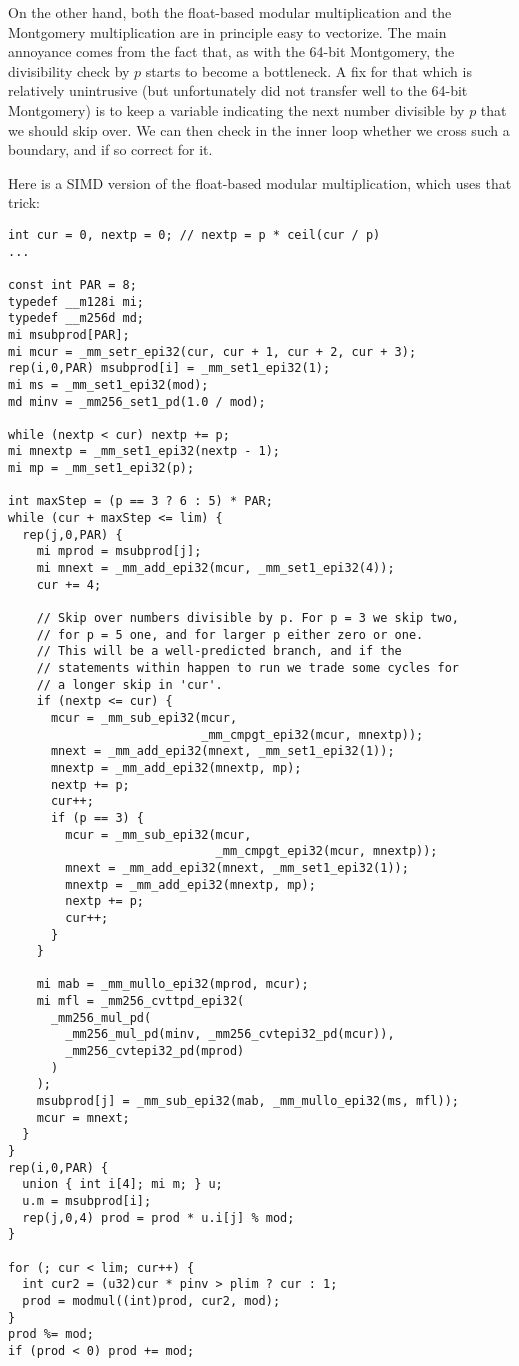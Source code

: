 On the other hand, both the float-based modular multiplication and the Montgomery multiplication are in principle easy to vectorize.
The main annoyance comes from the fact that, as with the 64-bit Montgomery, the divisibility check by $p$ starts to become a bottleneck.
A fix for that which is relatively unintrusive (but unfortunately did not transfer well to the 64-bit Montgomery) is to keep a variable indicating the next number divisible by $p$ that we should skip over.
We can then check in the inner loop whether we cross such a boundary, and if so correct for it.

Here is a SIMD version of the float-based modular multiplication, which uses that trick:

\begin{lstlisting}
int cur = 0, nextp = 0; // nextp = p * ceil(cur / p)
...

const int PAR = 8;
typedef __m128i mi;
typedef __m256d md;
mi msubprod[PAR];
mi mcur = _mm_setr_epi32(cur, cur + 1, cur + 2, cur + 3);
rep(i,0,PAR) msubprod[i] = _mm_set1_epi32(1);
mi ms = _mm_set1_epi32(mod);
md minv = _mm256_set1_pd(1.0 / mod);

while (nextp < cur) nextp += p;
mi mnextp = _mm_set1_epi32(nextp - 1);
mi mp = _mm_set1_epi32(p);

int maxStep = (p == 3 ? 6 : 5) * PAR;
while (cur + maxStep <= lim) {
  rep(j,0,PAR) {
    mi mprod = msubprod[j];
    mi mnext = _mm_add_epi32(mcur, _mm_set1_epi32(4));
    cur += 4;

    // Skip over numbers divisible by p. For p = 3 we skip two,
    // for p = 5 one, and for larger p either zero or one.
    // This will be a well-predicted branch, and if the
    // statements within happen to run we trade some cycles for
    // a longer skip in 'cur'.
    if (nextp <= cur) {
      mcur = _mm_sub_epi32(mcur,
                           _mm_cmpgt_epi32(mcur, mnextp));
      mnext = _mm_add_epi32(mnext, _mm_set1_epi32(1));
      mnextp = _mm_add_epi32(mnextp, mp);
      nextp += p;
      cur++;
      if (p == 3) {
        mcur = _mm_sub_epi32(mcur,
                             _mm_cmpgt_epi32(mcur, mnextp));
        mnext = _mm_add_epi32(mnext, _mm_set1_epi32(1));
        mnextp = _mm_add_epi32(mnextp, mp);
        nextp += p;
        cur++;
      }
    }

    mi mab = _mm_mullo_epi32(mprod, mcur);
    mi mfl = _mm256_cvttpd_epi32(
      _mm256_mul_pd(
        _mm256_mul_pd(minv, _mm256_cvtepi32_pd(mcur)),
        _mm256_cvtepi32_pd(mprod)
      )
    );
    msubprod[j] = _mm_sub_epi32(mab, _mm_mullo_epi32(ms, mfl));
    mcur = mnext;
  }
}
rep(i,0,PAR) {
  union { int i[4]; mi m; } u;
  u.m = msubprod[i];
  rep(j,0,4) prod = prod * u.i[j] % mod;
}

for (; cur < lim; cur++) {
  int cur2 = (u32)cur * pinv > plim ? cur : 1;
  prod = modmul((int)prod, cur2, mod);
}
prod %= mod;
if (prod < 0) prod += mod;
\end{lstlisting}

